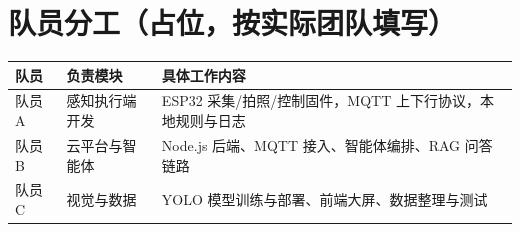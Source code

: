 ﻿\documentclass[11pt]{ctexart}
\begin{document}
\section{队员分工（占位，按实际团队填写）}
\begin{longtable}{p{1.8cm}p{3.8cm}p{9.6cm}}
  \toprule
  队员 & 负责模块 & 具体工作内容 \\
  \midrule
  队员 A & 感知执行端开发 & ESP32 采集/拍照/控制固件，MQTT 上下行协议，本地规则与日志 \\
  队员 B & 云平台与智能体 & Node.js 后端、MQTT 接入、智能体编排、RAG 问答链路 \\
  队员 C & 视觉与数据 & YOLO 模型训练与部署、前端大屏、数据整理与测试 \\
  \bottomrule
\end{longtable}
\end{document}
